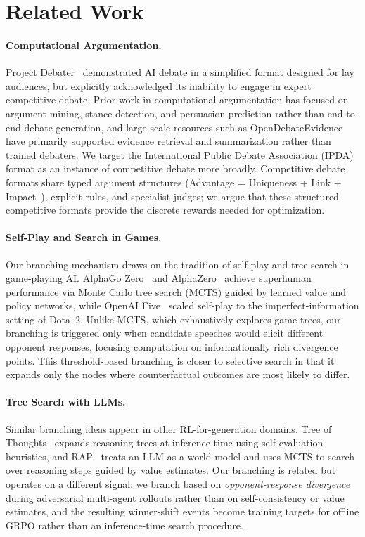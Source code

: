 \section{Related Work}
\label{sec:related}

\paragraph{Computational Argumentation.}
Project Debater~\cite{slonim2021debater} demonstrated AI debate in a
simplified format designed for lay audiences, but explicitly acknowledged
its inability to engage in expert competitive debate. Prior work in
computational argumentation has focused on argument mining, stance detection,
and persuasion prediction rather than end-to-end debate generation, and
large-scale resources such as OpenDebateEvidence~\cite{roush2024opendebateevidence}
have primarily supported evidence retrieval and summarization rather than
trained debaters. We target the International Public Debate Association
(IPDA) format as an instance of competitive debate more broadly. Competitive
debate formats share typed argument structures
(Advantage = Uniqueness + Link + Impact~\cite{snider2008code}), explicit
rules, and specialist judges; we argue that these structured competitive
formats provide the discrete rewards needed for optimization.

\paragraph{Self-Play and Search in Games.}
Our branching mechanism draws on the tradition of self-play and tree search
in game-playing AI. AlphaGo Zero~\cite{silver2017mastering} and
AlphaZero~\cite{silver2018general} achieve superhuman performance via
Monte Carlo tree search (MCTS) guided by learned value and policy networks,
while OpenAI Five~\cite{berner2019dota} scaled self-play to the imperfect-information
setting of Dota~2. Unlike MCTS, which exhaustively explores game trees,
our branching is triggered only when candidate speeches would elicit
different opponent responses, focusing computation on informationally
rich divergence points. This threshold-based branching is closer to
selective search in that it expands only the nodes where counterfactual
outcomes are most likely to differ.

\paragraph{Tree Search with LLMs.}
Similar branching ideas appear in other RL-for-generation domains. Tree of
Thoughts~\cite{yao2023tree} expands reasoning trees at inference time using
self-evaluation heuristics, and RAP~\cite{hao2023reasoning} treats an LLM as
a world model and uses MCTS to search over reasoning steps guided by value
estimates. Our branching is related but operates on a different signal: we
branch based on \emph{opponent-response divergence} during adversarial
multi-agent rollouts rather than on self-consistency or value estimates, and
the resulting winner-shift events become training targets for offline GRPO
rather than an inference-time search procedure.

